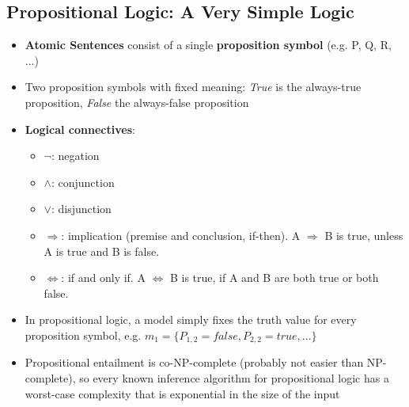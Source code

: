 \documentclass{scrartcl}
\begin{document}
\subsection{Propositional Logic: A Very Simple Logic}
\begin{itemize}
    \item
        \textbf{Atomic Sentences} consist of a single \textbf{proposition symbol} (e.g. P, Q, R, ...)
    \item
        Two proposition symbols with fixed meaning: \textit{True} is the always-true proposition, \textit{False} the always-false proposition 
    \item
        \textbf{Logical connectives}:
    \begin{itemize}
        \item
            $\lnot$: negation 
        \item
            $\land$: conjunction
        \item
            $\lor$: disjunction
        \item
            $\Rightarrow$: implication (premise and conclusion, if-then). A $\Rightarrow$ B is true, unless A is true and B is false.
        \item
            $\Leftrightarrow$: if and only if. A $\Leftrightarrow$ B is true, if A and B are both true or both false. 
    \end{itemize} 
    \item
        In propositional logic, a model simply fixes the truth value for every proposition symbol, e.g. $m_{1} = \{P_{1,2} = false, P_{2,2} = true, ...\}$ 
    \item
        Propositional entailment is co-NP-complete (probably not easier than NP-complete), so every known inference algorithm for propositional logic has a worst-case complexity that is exponential in the size of the input
\end{itemize}  
\end{document}

